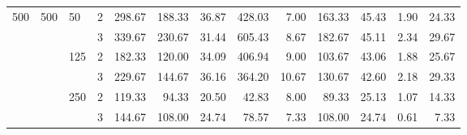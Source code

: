 \begin{tabular}{llllrrrrrrrrr}
\multirow{6}{*}{500} & \multirow{6}{*}{500} & \multirow{2}{*}{50} & 2 & 298.67 & 188.33 &       36.87 & 428.03 &  7.00 & 163.33 &       45.43 & 1.90 & 24.33 \\
    &     &     & 3 & 339.67 & 230.67 &       31.44 & 605.43 &  8.67 & 182.67 &       45.11 & 2.34 & 29.67 \\
\cline{3-13}
    &     & \multirow{2}{*}{125} & 2 & 182.33 & 120.00 &       34.09 & 406.94 &  9.00 & 103.67 &       43.06 & 1.88 & 25.67 \\
    &     &     & 3 & 229.67 & 144.67 &       36.16 & 364.20 & 10.67 & 130.67 &       42.60 & 2.18 & 29.33 \\
\cline{3-13}
    &     & \multirow{2}{*}{250} & 2 & 119.33 &  94.33 &       20.50 &  42.83 &  8.00 &  89.33 &       25.13 & 1.07 & 14.33 \\
    &     &     & 3 & 144.67 & 108.00 &       24.74 &  78.57 &  7.33 & 108.00 &       24.74 & 0.61 &  7.33 \\
\bottomrule
\end{tabular}
